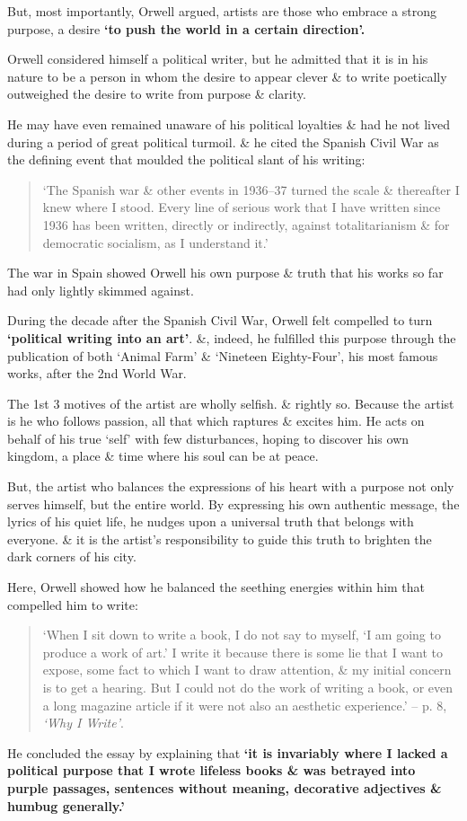 \documentclass[oneside]{book}
\numberwithin{equation}{section}
\begin{document}
But, most importantly, Orwell argued, artists are those who embrace a strong purpose, a desire \textbf{`to push the world in a certain direction'.}

Orwell considered himself a political writer, but he admitted that it is in his nature to be a person in whom the desire to appear clever \& to write poetically outweighed the desire to write from purpose \& clarity.

He may have even remained unaware of his political loyalties \& had he not lived during a period of great political turmoil. \& he cited the Spanish Civil War as the defining event that moulded the political slant of his writing:

\begin{quotation}
	`The Spanish war \& other events in 1936--37 turned the scale \& thereafter I knew where I stood. Every line of serious work that I have written since 1936 has been written, directly or indirectly, against totalitarianism \& for democratic socialism, as I understand it.'
\end{quotation}
The war in Spain showed Orwell his own purpose \& truth that his works so far had only lightly skimmed against.

During the decade after the Spanish Civil War, Orwell felt compelled to turn \textbf{`political writing into an art'}. \&, indeed, he fulfilled this purpose through the publication of both `Animal Farm' \& `Nineteen Eighty-Four', his most famous works, after the 2nd World War.

The 1st 3 motives of the artist are wholly selfish. \& rightly so. Because the artist is he who follows passion, all that which raptures \& excites him. He acts on behalf of his true `self' with few disturbances, hoping to discover his own kingdom, a place \& time where his soul can be at peace.

But, the artist who balances the expressions of his heart with a purpose not only serves himself, but the entire world. By expressing his own authentic message, the lyrics of his quiet life, he nudges upon a universal truth that belongs with everyone. \& it is the artist's responsibility to guide this truth to brighten the dark corners of his city.

Here, Orwell showed how he balanced the seething energies within him that compelled him to write:

\begin{quotation}
	`When I sit down to write a book, I do not say to myself, `I am going to produce a work of art.' I write it because there is some lie that I want to expose, some fact to which I want to draw attention, \& my initial concern is to get a hearing. But I could not do the work of writing a book, or even a long magazine article if it were not also an aesthetic experience.' -- p. 8, \textit{`Why I Write'}.
\end{quotation}
He concluded the essay by explaining that \textbf{`it is invariably where I lacked a political purpose that I wrote lifeless books \& was betrayed into purple passages, sentences without meaning, decorative adjectives \& humbug generally.'}
\end{document}
